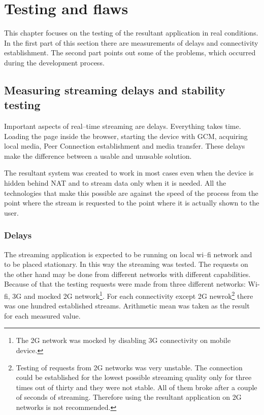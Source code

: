 % 
\chapter{Testing and flaws}
\label{chap:chapter6}
This chapter focuses on the testing of the resultant application in real conditions. In the first part of this section there are measurements of delays and connectivity establishment. The second part points out some of the problems, which occurred during the development process.


\section{Measuring streaming delays and stability testing}
Important aspects of real--time streaming are delays. Everything takes time. Loading the page inside the browser, starting the device with GCM, acquiring local media, Peer Connection establishment and media transfer. These delays make the difference between a usable and unusable solution.

The resultant system was created to work in most cases even when the device is hidden behind NAT and to stream data only when it is needed. All the technologies that make this possible are against the speed of the process from the point where the stream is requested to the point where it is actually shown to the user.


\subsection{Delays}
 The streaming application is expected to be running on local wi--fi network and to be placed stationary. In this way the streaming was tested. The requests on the other hand may be done from different networks with different capabilities. Because of that the testing requests were made from three different networks: Wi-fi, 3G and mocked 2G network\footnote{The 2G network was mocked by disabling 3G connectivity on mobile device.}. For each connectivity except 2G newrok\footnote{Testing of requests from 2G networks was very unstable. The connection could be established for the lowest possible streaming quality only for three times out of thirty and they were not stable. All of them broke after a couple of seconds of streaming. Therefore using the resultant application on 2G networks is not recommended.} there was one hundred established streams. Arithmetic mean was taken as the result for each measured value.\\

